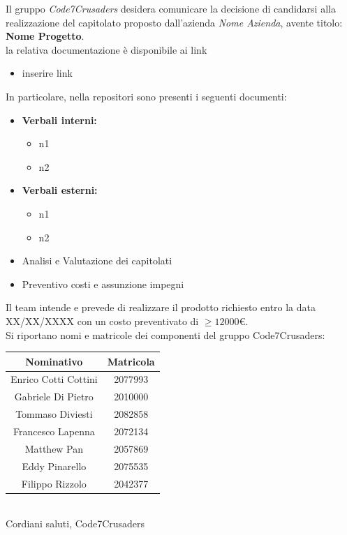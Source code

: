 \documentclass{article}
\begin{document}
Il gruppo \textit{Code7Crusaders} desidera comunicare la decisione di candidarsi alla realizzazione del capitolato proposto dall'azienda \textit{Nome Azienda}, avente titolo: \textbf{Nome Progetto}.
\\
la relativa documentazione è disponibile ai link
\begin{itemize}
    \item inserire link
\end{itemize}
In particolare, nella repositori sono presenti i seguenti documenti:
\begin{itemize}
    \item \textbf{Verbali interni:}
    \begin{itemize}
        \item n1
        \item n2
    \end{itemize}
    \item \textbf{Verbali esterni:}
    \begin{itemize}
        \item n1
        \item n2
    \end{itemize}
    \item Analisi e Valutazione dei capitolati
    \item Preventivo costi e assunzione impegni
\end{itemize}
Il team intende e prevede di realizzare il prodotto richiesto entro la data XX/XX/XXXX con un costo preventivato di $\ge 12000$\euro.
\\
Si riportano nomi e matricole dei componenti del gruppo Code7Crusaders:
\\
\endline
    \centering
    \begin{tabular}{|c|c|}
        \hline
        \textbf{Nominativo} & \textbf{Matricola} \\
        \hline
         Enrico Cotti Cottini & 2077993\\
         Gabriele Di Pietro & 2010000\\
         Tommaso Diviesti & 2082858\\
         Francesco Lapenna & 2072134\\
         Matthew Pan & 2057869\\
         Eddy Pinarello & 2075535\\
         Filippo Rizzolo & 2042377\\
         \hline
    \end{tabular}
    \endcentering
\\
Cordiani saluti, Code7Crusaders
\end{document}
